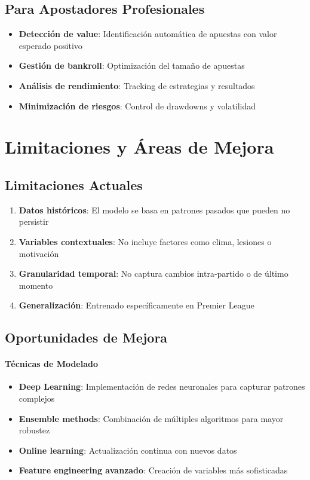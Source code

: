 \documentclass{article}
\begin{document}
\subsection{Para Apostadores Profesionales}

\begin{itemize}
    \item \textbf{Detección de value}: Identificación automática de apuestas con valor esperado positivo
    \item \textbf{Gestión de bankroll}: Optimización del tamaño de apuestas
    \item \textbf{Análisis de rendimiento}: Tracking de estrategias y resultados
    \item \textbf{Minimización de riesgos}: Control de drawdowns y volatilidad
\end{itemize}

\section{Limitaciones y Áreas de Mejora}

\subsection{Limitaciones Actuales}

\begin{enumerate}
    \item \textbf{Datos históricos}: El modelo se basa en patrones pasados que pueden no persistir
    \item \textbf{Variables contextuales}: No incluye factores como clima, lesiones o motivación
    \item \textbf{Granularidad temporal}: No captura cambios intra-partido o de último momento
    \item \textbf{Generalización}: Entrenado específicamente en Premier League
\end{enumerate}

\subsection{Oportunidades de Mejora}

\paragraph{Técnicas de Modelado}
\begin{itemize}
    \item \textbf{Deep Learning}: Implementación de redes neuronales para capturar patrones complejos
    \item \textbf{Ensemble methods}: Combinación de múltiples algoritmos para mayor robustez
    \item \textbf{Online learning}: Actualización continua con nuevos datos
    \item \textbf{Feature engineering avanzado}: Creación de variables más sofisticadas
\end{itemize}
\end{document}
